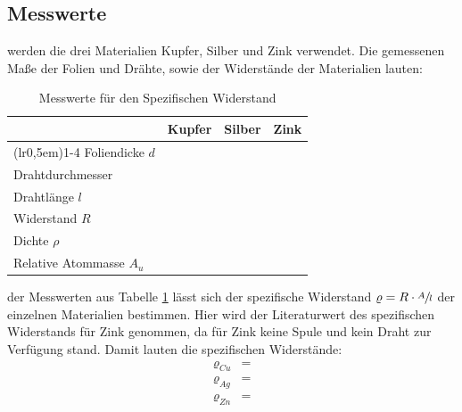 \subsection{Messwerte} \label{sec:5.1}

\justifying werden die drei Materialien Kupfer, Silber und Zink verwendet. 
 Die gemessenen Maße der Folien und Drähte, sowie der Widerstände der Materialien lauten:

\begin{table}[H]
\centering
    \begin{tabular}{l r r r}
    \toprule
        \multicolumn{1}{c}{} & \multicolumn{1}{c}{Kupfer} & \multicolumn{1}{c}{Silber} & \multicolumn{1}{c}{Zink}\\
        \cmidrule(lr{0,5em}){1-4}
        Foliendicke $d$        & \text{}   & \text{}   & \text{}\\
        Drahtdurchmesser    & \text{}   & \text{}   & \text{}\\
        Drahtlänge $l$         & \text{}         & \text{}         & \text{}\\
        Widerstand $R$         & \text{}         & \text{}         & \text{}\\
        Dichte  $\rho$            & \text{}    & \text{}    & \text{}\\
        Relative Atommasse $A_u$      & \text{} & \text{} & \text{}\\
        \bottomrule
    \end{tabular}
\caption{Messwerte für den Spezifischen Widerstand}
\label{tab:1}
\end{table}

\justifying der Messwerten aus Tabelle \ref{tab:1} lässt sich der spezifische Widerstand $\varrho = R \cdot \sfrac{A}{l}$
der einzelnen Materialien bestimmen. Hier wird der Literaturwert des spezifischen Widerstands für Zink \cite{SpWiderstand_Zn} genommen, da für 
Zink keine Spule und kein Draht zur Verfügung stand. Damit lauten die spezifischen Widerstände:
\begin{subequations} \label{eq:15}
\begin{align}
    \varrho_{Cu} &= \text{} \label{eq:15a}\\
    \varrho_{Ag} &= \text{} \label{eq:15b}\\
    \varrho_{Zn} &= \text{} \label{eq:15c}
\end{align}
\end{subequations}

